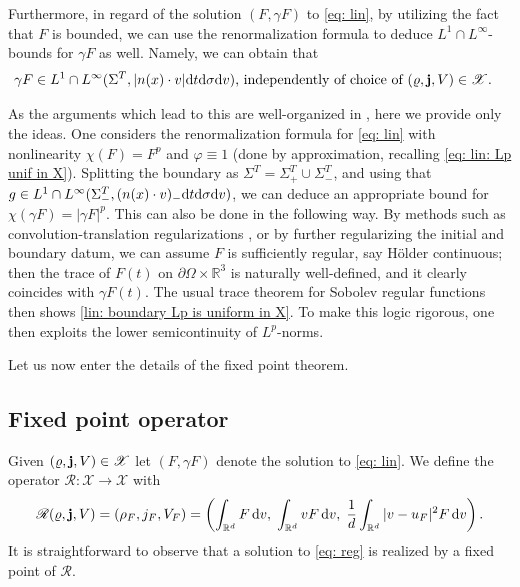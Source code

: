 \documentclass[10pt, reqno]{amsart}
\theoremstyle{plain}
\theoremstyle{definition}
\theoremstyle{remark}
\numberwithin{equation}{section}
\newcommand{\bfj}{{\bf j}}
\newcommand{\scrR}{\mathscr R}
\newcommand{\p}{\partial}
\newcommand{\R}{\mathbb{R}}
\newcommand{\dv}{\textnormal{d}v}
\newcommand{\dt}{\textnormal{d}t}
\newcommand{\tnd}{\textnormal{d}}
\newcommand{\lt}{\left}
\newcommand{\rt}{\right}
\newcommand{\intr}{\int_{\R^d}}
\begin{document}
Furthermore, in regard of the solution $(F,\gamma F)$ to \eqref{eq: lin}, by utilizing the fact that $F$ is bounded, we can use the renormalization formula to deduce $L^1\cap L^\infty$-bounds for $\gamma F$ as well. Namely, we can obtain that
\begin{equation} \label{lin: boundary Lp is uniform in X}
\begin{split}
&\textnormal{$\gamma F\in L^1 \cap L^\infty(\Sigma^T, |n(x)\cdot v| \dt\tnd\sigma\dv )$,} \textnormal{ independently of choice of $(\varrho,  \bfj, V) \in \mathscr{X}$}.
\end{split}
\end{equation}

As the arguments which lead to this are well-organized in \cite{Mischler2000, Mischler2010}, here we provide only the ideas. One considers the renormalization formula for \eqref{eq: lin} with nonlinearity $\chi(F) = F^p$ and $\varphi\equiv 1$ (done by approximation, recalling \eqref{eq: lin: Lp unif in X}). Splitting the boundary as $\Sigma^T = \Sigma_+^T \cup \Sigma_-^T$, and using that $g\in L^1\cap L^\infty(\Sigma_-^T,(n(x)\cdot v)_- \dt\tnd\sigma\dv)$, we can deduce an appropriate bound for $\chi(\gamma F) = |\gamma F|^p$. This can also be done in the following way. By methods such as convolution-translation regularizations \cite{BlouzaLeDret2001}, or by further regularizing the initial and boundary datum, we can assume $F$ is sufficiently regular, say H\"older continuous; then the trace of $F(t)$ on $\p\Omega\times\R^3$ is naturally well-defined, and it clearly coincides with $\gamma F(t)$. The usual trace theorem for Sobolev regular functions then shows \eqref{lin: boundary Lp is uniform in X}. To make this logic rigorous, one then exploits the lower semicontinuity of $L^p$-norms.

Let us now enter the details of the fixed point theorem.
%
%
%
%
%
%
\subsection{Fixed point operator}\label{sec: fixed}

Given $(\varrho, \bfj, V)\in \mathscr{X}$ let $(F,\gamma F)$ denote the solution to \eqref{eq: lin}. We define the operator $\mathscr{R}:\mathscr{X}\to \mathscr{X}$ with 
\begin{align*}
    \scrR (\varrho, \bfj, V) = (\rho_F, j_F, V_F) = \lt(\intr F\,\dv, \; \intr vF \,\dv, \; \frac{1}{d}\intr |v-u_F|^2 F\,\dv \rt).
\end{align*}
It is straightforward to observe that a solution to \eqref{eq: reg} is realized by a fixed point of $\mathscr{R}$.
\end{document}
